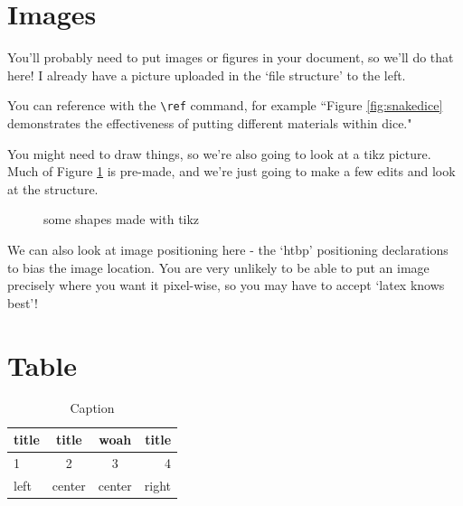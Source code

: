 \documentclass{article}
\begin{document}
\section{Images}

You'll probably need to put images or figures in your document, so we'll do that here! I already have a picture uploaded in the `file structure' to the left.



You can reference with the \texttt{\textbackslash ref} command, for example ``Figure \ref{fig:snakedice} demonstrates the effectiveness of putting different materials within dice."



You might need to draw things, so we're also going to look at a tikz picture. Much of Figure \ref{fig:tikzExample} is pre-made, and we're just going to make a few edits and look at the structure.
\begin{figure}
\begin{center}
\caption{some shapes made with tikz}
\label{fig:tikzExample}
\end{center}
\end{figure}

We can also look at image positioning here - the `htbp' positioning declarations to bias the image location. You are very unlikely to be able to put an image precisely where you want it pixel-wise, so you may have to accept `latex knows best'!

\section{Table}

\begin{table}[]
    \centering
    \begin{tabular}{l|||c|cr}
    title & title & woah & title \\ \hline
        1 &2  &3&4\\
        left & center & center & right 
    \end{tabular}
    \caption{Caption}
    \label{tab:placeholder}
\end{table}
\end{document}

